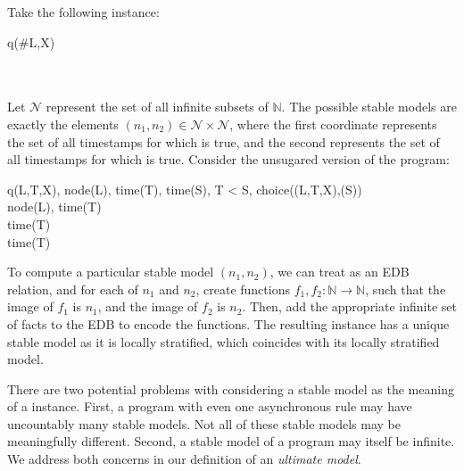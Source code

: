 \begin{example}
Take the following \lang instance:

\begin{Drules}
        {q(\#L,X)} \\
   \\
   \\
\end{Drules}

Let $\mathcal{N}$ represent the set of all infinite subsets of $\mathbb{N}$.
The possible stable models are exactly the elements $(n_1, n_2) \in \mathcal{N}
\times \mathcal{N}$, where the first coordinate represents the set of all
timestamps for which  is true, and the second represents the
set of all timestamps for which  is true.  Consider the
unsugared version of the program:

\begin{Drules}
        {q(L,T,X), node(L), time(T), time(S), T < S, choice((L,T,X),(S))} \\
        {node(L), time(T)} \\
        {time(T)} \\
        {time(T)}
\end{Drules}

To compute a particular stable model $(n_1,n_2)$, we can treat  as an EDB relation, and for each of $n_1$ and $n_2$, create functions $f_1, f_2 : \mathbb{N} \rightarrow \mathbb{N}$, such that the image of $f_1$ is $n_1$, and the image of $f_2$ is $n_2$.  Then, add the appropriate infinite set of  facts to the EDB to encode the functions.  The resulting instance has a unique stable model as it is locally stratified, which coincides with its locally stratified model.
\end{example}


There are two potential problems with considering a stable model as the meaning of a \lang instance.  
First, a program with even one asynchronous rule may have uncountably many stable models.  
Not all of these stable models may be meaningfully different.  Second, a stable model of a \lang program may itself be infinite.  We address both concerns in our definition of an {\em ultimate model}.

